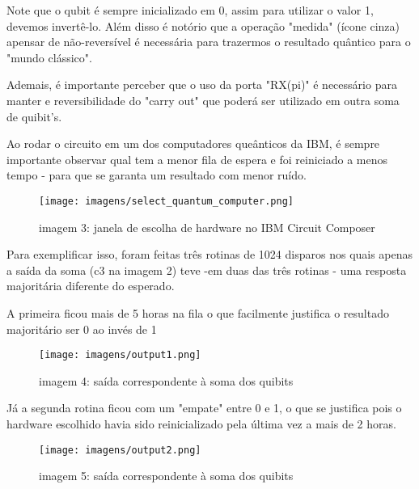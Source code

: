 \documentclass[12pt, a4paper]{article} %
\begin{document}
        Note que o qubit \'e sempre inicializado em 0, assim para utilizar o valor 1, devemos invert\^e-lo. Al\'em disso \'e not\'orio que a opera\c{c}\~ao "medida" (\'icone cinza) apensar de n\~ao-revers\'ivel \'e necess\'aria para trazermos o resultado qu\^antico para o "mundo cl\'assico".
    
        Ademais, \'e importante perceber que o uso da porta "RX(pi)" \'e necess\'ario para manter e reversibilidade do "carry out" que poder\'a ser utilizado em outra soma de quibit's.
    
        Ao rodar o circuito em um dos computadores que\^anticos da IBM, \'e sempre importante observar qual tem a menor fila de espera e foi reiniciado a menos tempo - para que se garanta um resultado com menor ru\'ido.
        
        \begin{figure}[H]
        
        \centering
        
        \texttt{[image: imagens/select\_quantum\_computer.png]}
        
        imagem 3: janela de escolha de hardware no IBM Circuit Composer
        
        \end{figure}

        Para exemplificar isso, foram feitas tr\^es rotinas de 1024 disparos nos quais apenas a saída da soma (c3 na imagem 2) teve -em duas das tr\^es rotinas - uma resposta majorit\'aria diferente do esperado.

        A primeira ficou mais de 5 horas na fila o que facilmente justifica o resultado majoritário ser 0 ao invés de 1

        \begin{figure}[H]
        
        \centering
        
        \texttt{[image: imagens/output1.png]}
        
        imagem 4: sa\'ida correspondente \`a soma dos quibits
        
        \end{figure}

        J\'a a segunda rotina ficou com um "empate" entre 0 e 1, o que se justifica pois o hardware escolhido havia sido reinicializado pela \'ultima vez a mais de 2 horas.

        \begin{figure}[H]
        
        \centering
        
        \texttt{[image: imagens/output2.png]}
        
        imagem 5: sa\'ida correspondente \`a soma dos quibits
        
        \end{figure}
\end{document}
